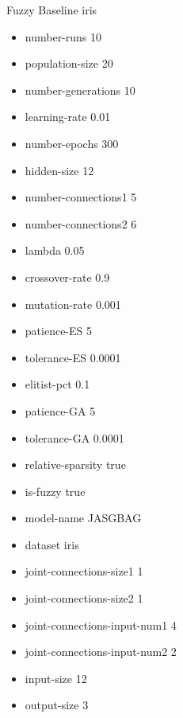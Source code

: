 Fuzzy Baseline
iris
\begin{itemize}
\item number-runs 10
\item population-size 20
\item number-generations 10
\item learning-rate 0.01
\item number-epochs 300
\item hidden-size 12
\item number-connections1 5
\item number-connections2 6
\item lambda 0.05
\item crossover-rate 0.9
\item mutation-rate 0.001
\item patience-ES 5
\item tolerance-ES 0.0001
\item elitist-pct 0.1
\item patience-GA 5
\item tolerance-GA 0.0001
\item relative-sparsity true
\item is-fuzzy true
\item model-name JASGBAG
\item dataset iris
\item joint-connections-size1 1
\item joint-connections-size2 1
\item joint-connections-input-num1 4
\item joint-connections-input-num2 2
\item input-size 12
\item output-size 3
\end{itemize}

